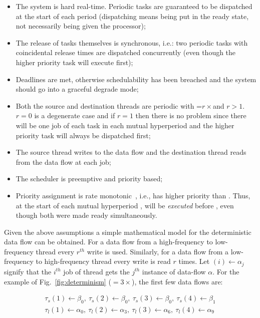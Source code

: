 \begin{itemize}
\item{The system is hard real-time. Periodic tasks are guaranteed to
  be dispatched at the start of each period (dispatching means being
  put in the ready state, not necessarily being given the processor);}
\item{The release of tasks themselves is synchronous, i.e.: two
  periodic tasks with coincidental release times are dispatched
  concurrently (even though the higher priority task will execute
  first);}
\item{Deadlines are met, otherwise schedulability has been breached
  and the system should go into a graceful degrade mode;}
\item{Both the source and destination threads are periodic with
  \plong=$r\times$\pshort and $r>1$. $r=0$ is a degenerate case and
  if $r=1$ then there is no problem since there will be one job of
  each task in each mutual hyperperiod and the higher priority task
  will always be dispatched first;}
\item{The source thread writes to the data flow and the destination
  thread reads from the data flow at each job;}
\item{The scheduler is preemptive and priority based;}
\item{Priority assignment is rate monotonic~\cite{liu@jacm73}, i.e.,
  \ts has higher priority than \tl. Thus, at the start of each mutual
  hyperperiod \plong, \ts will be \emph{executed} before \tl, even
  though both were made ready simultaneously.}
\end{itemize}

Given the above assumptions a simple mathematical model for the
deterministic data flow can be obtained. For a data flow from a
high-frequency to low-frequency thread every $r^{th}$ write is
used. Similarly, for a data flow from a low-frequency to
high-frequency thread every write is read $r$ times. Let
\tl$(i)\gets\alpha_j$ signify that the $i^{th}$ job of thread \tl gets
the $j^{th}$ instance of data-flow $\alpha$. For the example of
Fig.~\ref{fig:determinism} (\plong$=3\times$\pshort), the first few
data flows are:

\begin{displaymath}
  \begin{split}
  \tau_s(1)\gets\beta_0,\ \tau_s(2)\gets\beta_0,\
  \tau_s(3)\gets\beta_0,\ \tau_s(4)\gets\beta_1\\
  \tau_l(1)\gets\alpha_0,\ \tau_l(2)\gets\alpha_3,\
  \tau_l(3)\gets\alpha_6,\ \tau_l(4)\gets\alpha_9
  \end{split}
\end{displaymath}

